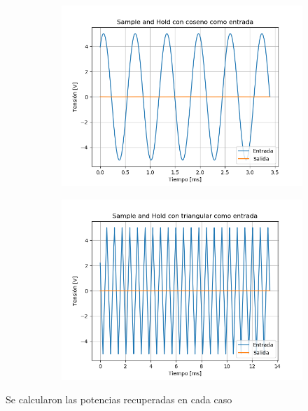 \begin{figure}[H]
	\begin{subfigure}{.5\textwidth}
	\centering
	\includegraphics[width=\textwidth]{ImagenesEjercicio6/puntob2/SH - Cos.png}
	\end{subfigure}
	\begin{subfigure}{.5\textwidth}
	\centering
	\includegraphics[width=\textwidth]{ImagenesEjercicio6/puntob2/SH - Tri.png}
	\end{subfigure}
\end{figure}

Se calcularon las potencias recuperadas en cada caso

